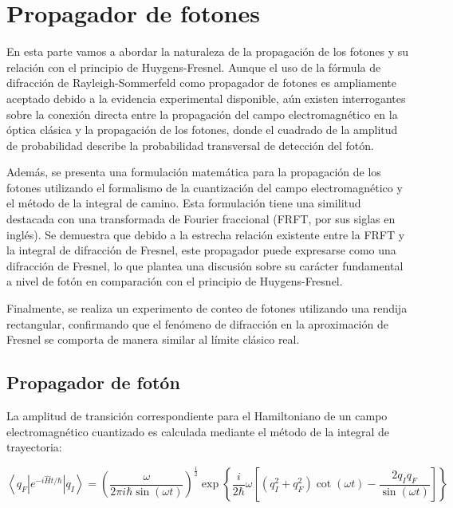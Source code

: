 \section{Propagador de fotones}

    En esta parte vamos a abordar la naturaleza de la propagación de los fotones y su relación con el principio de Huygens-Fresnel. Aunque el uso de la fórmula de difracción de Rayleigh-Sommerfeld como propagador de fotones es ampliamente aceptado debido a la evidencia experimental disponible, aún existen interrogantes sobre la conexión directa entre la propagación del campo electromagnético en la óptica clásica y la propagación de los fotones, donde el cuadrado de la amplitud de probabilidad describe la probabilidad transversal de detección del fotón.

    Además, se presenta una formulación matemática para la propagación de los fotones utilizando el formalismo de la cuantización del campo electromagnético y el método de la integral de camino. Esta formulación tiene una similitud destacada con una transformada de Fourier fraccional (FRFT, por sus siglas en inglés). Se demuestra que debido a la estrecha relación existente entre la FRFT y la integral de difracción de Fresnel, este propagador puede expresarse como una difracción de Fresnel, lo que plantea una discusión sobre su carácter fundamental a nivel de fotón en comparación con el principio de Huygens-Fresnel.
    
    Finalmente, se realiza un experimento de conteo de fotones utilizando una rendija rectangular, confirmando que el fenómeno de difracción en la aproximación de Fresnel se comporta de manera similar al límite clásico real.
    \subsection{Propagador de fotón}
    
    La amplitud de transición correspondiente para el Hamiltoniano de un campo electromagnético cuantizado es calculada mediante el método de la integral de trayectoria:
    
    \begin{equation}
        \left < q_{F} \left | e^{-i\hat{H}t/\hbar} \right | q_{I} \right > = \left ( \frac{\omega}{2\pi i \hbar \sin (\omega t)} \right ) ^{\frac{1}{2}} \exp \left \{  \frac{i}{2\hbar}\omega  \left [ \left (  q_{I}^{2}+q_{F}^{2} \right ) \cot (\omega t) - \frac{2q_{I}q_{F}}{\sin (\omega t)} \right ] \right \}
    \end{equation}
    
